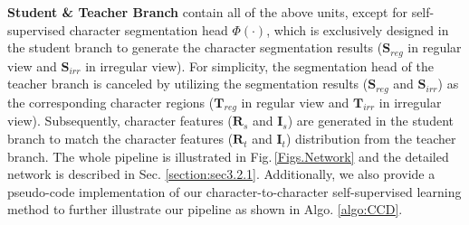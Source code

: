 \documentclass[10pt,twocolumn,letterpaper]{article}
\begin{document}
\noindent \textbf{Student \& Teacher Branch}
contain all of the above units, except for self-supervised character segmentation head $\mathcal{\varPhi(\cdot)}$, which is exclusively designed in the student branch to generate the character segmentation results ($\mathbf{S}_{reg}$ in regular view and $\mathbf{S}_{irr}$ in irregular view). 
For simplicity, the segmentation head of the teacher branch is canceled by utilizing the segmentation results ($\mathbf{S}_{reg}$ and $\mathbf{S}_{irr}$) as the corresponding character regions ($\mathbf{T}_{reg}$ in regular view and $\mathbf{T}_{irr}$ in irregular view).
Subsequently, character features ($\mathbf{R}_{s}$ and $\mathbf{I}_{s}$) are generated in the student branch to match the character features ($\mathbf{R}_{t}$ and $\mathbf{I}_{t}$) distribution from the teacher branch. The whole pipeline is illustrated in Fig.\,\ref{Figs.Network} and the detailed network is described in Sec. \ref{section:sec3.2.1}.
Additionally, we also provide a pseudo-code implementation of our character-to-character self-supervised learning method to further illustrate our pipeline as shown in Algo. \ref{algo:CCD}.
\end{document}
